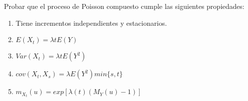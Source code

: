 \documentclass[twoside]{article}
\begin{document}
\begin{ejercicio}{12}
Probar que el proceso de Poisson compuesto cumple las siguientes propiedades:
	\begin{enumerate}
		\item Tiene incrementos independientes y estacionarios.
		
		\item $E(X_{t}) = \lambda t E(Y)$
		
		\item $Var(X_{t}) = \lambda t E(Y^{2})$
		
		\item $cov(X_t, X_s) = \lambda E(Y^{2}) min\{s,t\}$
		
		\item $m_{X_{t}} (u) = exp[\lambda (t) (M_{Y} (u) -1)]$
	\end{enumerate}
\end{ejercicio}
\end{document}
